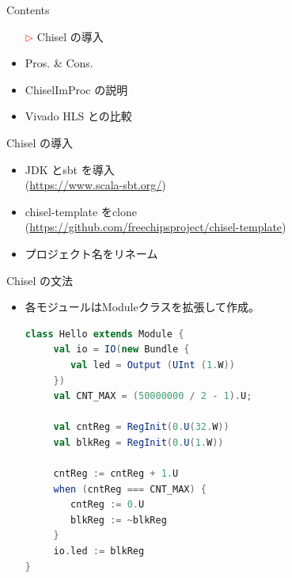 
\begin{frame}{Contents}
   \begin{itemize}
       \item[\textcolor{red}{$\rhd$}] Chisel の導入
       \item Pros. \& Cons.
       \item ChiselImProc の説明
       \item Vivado HLS との比較
   \end{itemize} 
\end{frame}


\begin{frame}{Chisel の導入}
    \begin{itemize}
        \item JDK とsbt を導入 \\
            (\url{https://www.scala-sbt.org/})
        \item chisel-template をclone \\
            (\url{https://github.com/freechipsproject/chisel-template})
            
        \item プロジェクト名をリネーム
    \end{itemize}
    
\end{frame}

\begin{frame}[fragile]{Chisel の文法}

    \begin{itemize}
        \item 各モジュールはModuleクラスを拡張して作成。
        \begin{lstlisting}[language=Scala,caption={Lチカモジュール}]
class Hello extends Module {
     val io = IO(new Bundle {
        val led = Output (UInt (1.W))
     })
     val CNT_MAX = (50000000 / 2 - 1).U;
     
     val cntReg = RegInit(0.U(32.W))
     val blkReg = RegInit(0.U(1.W))
     
     cntReg := cntReg + 1.U
     when (cntReg === CNT_MAX) {
        cntReg := 0.U
        blkReg := ~blkReg
     }
     io.led := blkReg
}
        \end{lstlisting}
    \end{itemize}
    
\end{frame}



